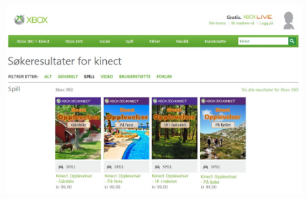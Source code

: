 \begin{figure} [H]
\centering
\includegraphics[scale=0.5, angle=90]{SpillXboxNYNY.jpg}
\label{fig:videogameseriesHeleNorsk}
\end{figure}

